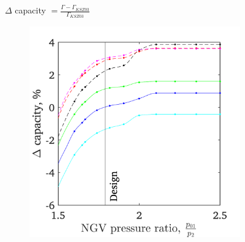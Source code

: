 \documentclass[a4paper, 11pt, oneside]{report}
\begin{document}
\begin{figure}[H]
	\centering
	$\Delta$ capacity $= \frac{\Gamma - \Gamma_{KSZ03}}{\Gamma_{KSZ03}}$
	\hspace{0.45cm}
	\begin{subfigure}{.45\textwidth}
		\centering
		\includegraphics[width=\linewidth]{figs/t900_2d_capacity_trends.png}
	\end{subfigure}
	\begin{subfigure}{.1125\textwidth}
		\centering

\end{subfigure}
\end{figure}
\end{document}
